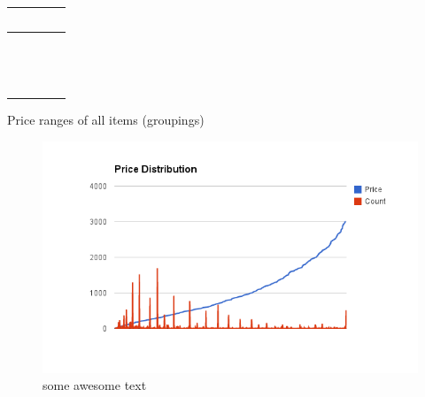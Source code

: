 \begin{table}
\begin{tabular}{l|l|l}
    ~                                                 & ~                                                                                                                                                                                                 & ~                                                                                                                                                                                                                    \\ \hline
    ~                                                 & ~                                                                                                                                                                                                 & ~                                                                                                                                                                                                                    \\ \hline
    ~                                                 & ~                                                                                                                                                                                                 & ~                                                                                                                                                                                                                    \\ \hline
    ~                                                 & ~                                                                                                                                                                                                 & ~                                                                                                                                                                                                                    \\
    \end{tabular}
\end{table}

        Price ranges of all items (groupings)

\begin{figure}[H]
    \includegraphics[width=5in]{image/price_distr.png}
    \centering
    \caption[Price distribution of items]{some awesome text}
    \label{figure:ratingdistr}
\end{figure}

